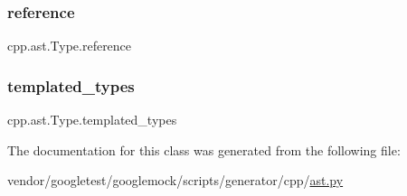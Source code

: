 \subsubsection{\texorpdfstring{reference}{reference}}
{\footnotesize\ttfamily cpp.\+ast.\+Type.\+reference}

\mbox{\label{classcpp_1_1ast_1_1_type_a7c38fcafa00dae6ee22bab783086a1a7}} 
\subsubsection{\texorpdfstring{templated\+\_\+types}{templated\_types}}
{\footnotesize\ttfamily cpp.\+ast.\+Type.\+templated\+\_\+types}



The documentation for this class was generated from the following file\+:\begin{DoxyCompactItemize}
\item 
vendor/googletest/googlemock/scripts/generator/cpp/\hyperlink{ast_8py}{ast.\+py}\end{DoxyCompactItemize}
